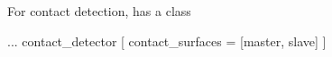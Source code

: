 For contact detection, \akantu has a class 

\begin{cpp}
  ...
  contact_detector [
    contact_surfaces = [master, slave]
  ]
\end{cpp}  